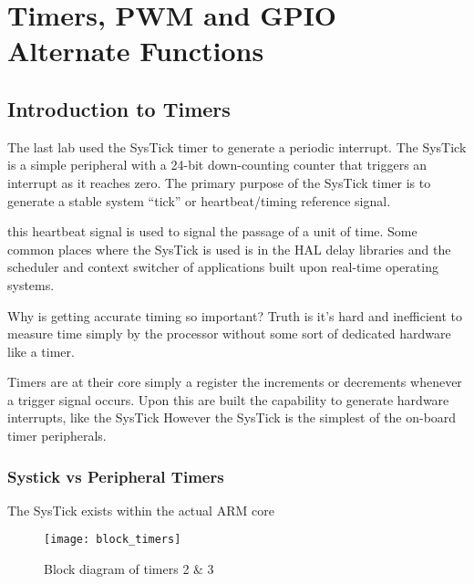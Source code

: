 \documentclass[11pt,fleqn]{book} %
\begin{document}
	
\chapter{Timers, PWM and GPIO Alternate Functions}

\section{Introduction to Timers}
The last lab used the SysTick timer to generate a periodic interrupt. The SysTick is a simple peripheral with a 24-bit down-counting counter that triggers an interrupt as it reaches zero. The primary purpose of the SysTick timer is to generate a stable system ``tick'' or heartbeat/timing reference signal. 

this heartbeat signal is used to signal the passage of a unit of time. Some common places where the SysTick is used is in the HAL delay libraries and the scheduler and context switcher of applications built upon real-time operating systems. 

Why is getting accurate timing so important? Truth is it's hard and inefficient to measure time simply by the processor without some sort of dedicated hardware like a timer. 

Timers are at their core simply a register the increments or decrements whenever a trigger signal occurs. Upon this are built the capability to generate hardware interrupts, like the SysTick However the SysTick is the simplest of the on-board timer peripherals.

    
    \subsection{Systick vs Peripheral Timers}
     The SysTick exists within the actual ARM core 
    
%        
        \begin{figure}[]
            \centering\texttt{[image: block\_timers]}
            \caption{Block diagram of timers 2 \& 3}
            \label{block_timers}
        \end{figure}
        
\end{document}
